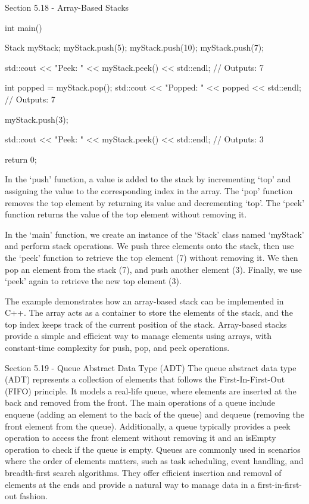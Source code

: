 \begin{notes}{Section 5.18 - Array-Based Stacks}
\begin{highlight}
\begin{code}[C++]
    int main() {
        Stack myStack;
        myStack.push(5);
        myStack.push(10);
        myStack.push(7);
    
        std::cout << "Peek: " << myStack.peek() << std::endl;  // Outputs: 7
    
        int popped = myStack.pop();
        std::cout << "Popped: " << popped << std::endl;  // Outputs: 7
    
        myStack.push(3);
    
        std::cout << "Peek: " << myStack.peek() << std::endl;  // Outputs: 3
    
        return 0;
    }
    \end{code}
        In the `push' function, a value is added to the stack by incrementing `top' and assigning the value to the corresponding index in the array. The `pop' function removes the top element by returning its value and decrementing `top'. The `peek' function returns the value of the top element without removing it.
    
        In the `main' function, we create an instance of the `Stack' class named `myStack' and perform stack operations. We push three elements onto the stack, then use the `peek' function to retrieve the top element (7) without removing it. We then pop an element from the stack (7), and push another element (3). Finally, we use `peek' again to retrieve the new top element (3).
    
        The example demonstrates how an array-based stack can be implemented in C++. The array acts as a container to store the elements of the stack, and the top index keeps track of the current position of the stack. Array-based stacks provide a simple and efficient way to manage elements using arrays, with constant-time complexity for push, pop, and peek operations.
    \end{highlight}
\end{notes}

\begin{notes}{Section 5.19 - Queue Abstract Data Type (ADT)}
    The queue abstract data type (ADT) represents a collection of elements that follows the First-In-First-Out (FIFO) principle. It models a real-life queue, where elements are inserted at the back and removed from the front. The main operations of a queue include enqueue (adding an element to the back of the queue) and dequeue (removing the front element from the queue). Additionally, 
    a queue typically provides a peek operation to access the front element without removing it and an isEmpty operation to check if the queue is empty. Queues are commonly used in scenarios where the order of elements matters, such as task scheduling, event handling, and breadth-first search algorithms. They offer efficient insertion and removal of elements at the ends and provide a 
    natural way to manage data in a first-in-first-out fashion.
\end{notes}

